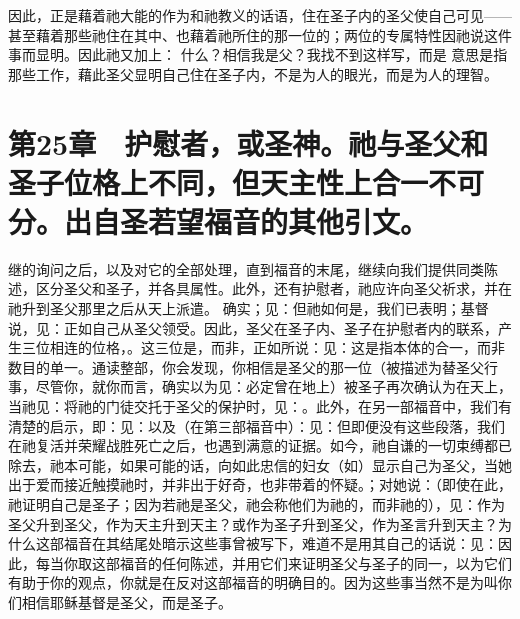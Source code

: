 因此，正是藉着祂大能的作为和祂教义的话语，住在圣子内的圣父使自己可见——甚至藉着那些祂住在其中、也藉着祂所住的那一位的；两位的专属特性因祂说这件事而显明。因此祂又加上： 什么？相信我是父？我找不到这样写，而是 意思是指那些工作，藉此圣父显明自己住在圣子内，不是为人的眼光，而是为人的理智。\par


\section{第25章　护慰者，或圣神。祂与圣父和圣子位格上不同，但天主性上合一不可分。出自圣若望福音的其他引文。}

继的询问之后，以及对它的全部处理，直到福音的末尾，继续向我们提供同类陈述，区分圣父和圣子，并各具属性。此外，还有护慰者，祂应许向圣父祈求，并在祂升到圣父那里之后从天上派遣。 确实；见：但祂如何是，我们已表明；基督说，见：正如自己从圣父领受。因此，圣父在圣子内、圣子在护慰者内的联系，产生三位相连的位格，。这三位是，而非，正如所说：见：这是指本体的合一，而非数目的单一。通读整部，你会发现，你相信是圣父的那一位（被描述为替圣父行事，尽管你，就你而言，确实以为见：必定曾在地上）被圣子再次确认为在天上，当祂见：将祂的门徒交托于圣父的保护时，见：。此外，在另一部福音中，我们有清楚的启示，即：见：以及（在第三部福音中）：见：但即便没有这些段落，我们在祂复活并荣耀战胜死亡之后，也遇到满意的证据。如今，祂自谦的一切束缚都已除去，祂本可能，如果可能的话，向如此忠信的妇女（如）显示自己为圣父，当她出于爱而接近触摸祂时，并非出于好奇，也非带着的怀疑。；对她说：（即使在此，祂证明自己是圣子；因为若祂是圣父，祂会称他们为祂的，而非祂的），见：作为圣父升到圣父，作为天主升到天主？或作为圣子升到圣父，作为圣言升到天主？为什么这部福音在其结尾处暗示这些事曾被写下，难道不是用其自己的话说：见：因此，每当你取这部福音的任何陈述，并用它们来证明圣父与圣子的同一，以为它们有助于你的观点，你就是在反对这部福音的明确目的。因为这些事当然不是为叫你们相信耶稣基督是圣父，而是圣子。\par

